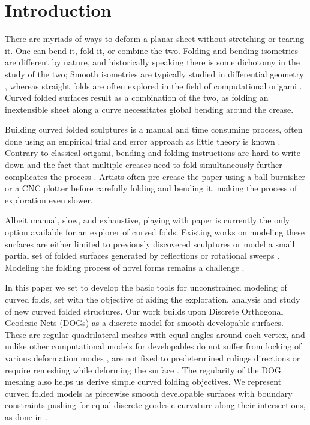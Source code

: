 \section{Introduction}
There are myriads of ways to deform a planar sheet without stretching or tearing it. One can bend it, fold it, or combine the two. Folding and bending isometries are different by nature, and historically speaking there is some dichotomy in the study of the two; Smooth isometries are typically studied in differential geometry \cite{do_carmo}, whereas straight folds are often explored in the field of computational origami \cite{origami_book}. Curved folded surfaces \cite{huffman} result as a combination of the two, as folding an inextensible sheet along a curve necessitates global bending around the crease.

Building curved folded sculptures is a manual and time consuming process, often done using an empirical trial and error approach  as little theory is known \cite{curved_review,huffmann_reconstructing}. Contrary to classical origami, bending and folding instructions are hard to write down and the fact that multiple creases need to fold simultaneously further complicates the process \cite{StringActuated:2017}. Artists often pre-crease the paper using a ball burnisher or a CNC plotter before carefully folding and bending it, making the process of exploration even slower. 

Albeit manual, slow, and exhaustive, playing with paper is currently the only option available for an explorer of curved folds. Existing works on modeling these surfaces are either limited to previously discovered sculptures \cite{curved_folding_kilian,StringActuated:2017} or model a small partial set of folded surfaces generated by reflections or rotational sweeps \cite{Mitani_ref,mitani2009design}. Modeling the folding process of novel forms remains a challenge \cite{curved_review}. 

In this paper we set to develop the basic tools for unconstrained modeling of curved folds, set with the objective of aiding the exploration, analysis and study of new curved folded structures. Our work builds upon Discrete Orthogonal Geodesic Nets (DOGs) \cite{rabi18,rabi2018shape} as a discrete model for smooth developable surfaces. These are regular quadrilateral meshes with equal angles around each vertex, and unlike other computational models for developables do not suffer from locking of various deformation modes \cite{locking1,locking2,grin_shells}, are not fixed to predetermined rulings directions \cite{pottmann_new,curved_folding_kilian} or require remeshing while deforming the surface \cite{StringActuated:2017,SchreckEG2017,Narain}. The regularity of the DOG meshing also helps us derive simple curved folding objectives. We represent curved folded models as piecewise smooth developable surfaces with boundary constraints pushing for equal discrete geodesic curvature along their intersections, as done in \cite{rabi2018shape}.


